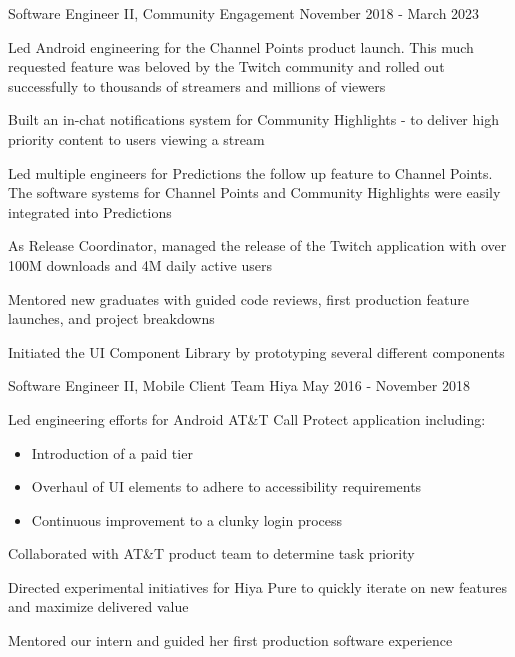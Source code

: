 \begin{cventries}
  \cventry
    {Software Engineer II, Community Engagement} %
    {} %
    {} %
    {November 2018 - March 2023} %
    {
    \begin{cvitems} %
    \item Led Android engineering for the Channel Points product launch. This much requested feature was beloved by the Twitch community and rolled out successfully to thousands of streamers and millions of viewers 
    \item Built an in-chat notifications system for Community Highlights - to deliver high priority content to users viewing a stream
    \item Led multiple engineers for Predictions the follow up feature to Channel Points. The software systems for Channel Points and Community Highlights were easily integrated into Predictions
    \item As Release Coordinator, managed the release of the Twitch application with over 100M downloads and 4M daily active users
    \item Mentored new graduates with guided code reviews, first production feature launches, and project breakdowns
    \item Initiated the UI Component Library by prototyping several different components
    \end{cvitems}
    }

 \cventry
    {Software Engineer II, Mobile Client Team} %
    {Hiya} %
    {} %
    {May 2016 - November 2018} %
    {
    \begin{cvitems} %
    \item { Led engineering efforts for Android AT\&T Call Protect application including:
        \begin{itemize}
            \item Introduction of a paid tier
            \item Overhaul of UI elements to adhere to accessibility requirements
            \item Continuous improvement to a clunky login process
        \end{itemize}}
    \item Collaborated with AT\&T product team to determine task priority
    \item Directed experimental initiatives for Hiya Pure to quickly iterate on new features and maximize delivered value
    \item Mentored our intern and guided her first production software experience
    \end{cvitems}
    }


\end{cventries}
